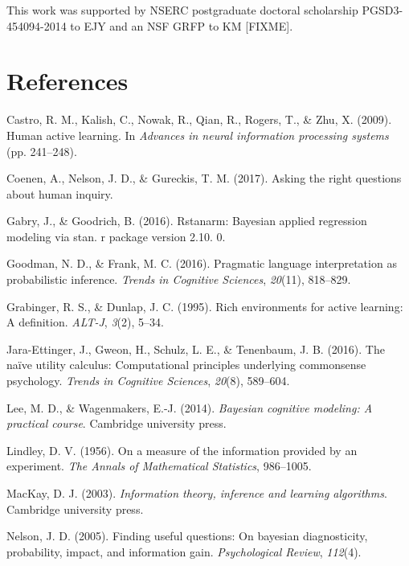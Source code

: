 \documentclass[10pt, letterpaper]{article}
\begin{document}
This work was supported by NSERC postgraduate doctoral scholarship
PGSD3-454094-2014 to EJY and an NSF GRFP to KM {[}FIXME{]}.

\section{References}\label{references}

\setlength{\parindent}{-0.1in} \setlength{\leftskip}{0.125in} \noindent

\hypertarget{refs}{}
\hypertarget{ref-castro2009human}{}
Castro, R. M., Kalish, C., Nowak, R., Qian, R., Rogers, T., \& Zhu, X.
(2009). Human active learning. In \emph{Advances in neural information
processing systems} (pp. 241--248).

\hypertarget{ref-coenen2017}{}
Coenen, A., Nelson, J. D., \& Gureckis, T. M. (2017). Asking the right
questions about human inquiry.

\hypertarget{ref-gabry2016rstanarm}{}
Gabry, J., \& Goodrich, B. (2016). Rstanarm: Bayesian applied regression
modeling via stan. r package version 2.10. 0.

\hypertarget{ref-goodman2016}{}
Goodman, N. D., \& Frank, M. C. (2016). Pragmatic language
interpretation as probabilistic inference. \emph{Trends in Cognitive
Sciences}, \emph{20}(11), 818--829.

\hypertarget{ref-grabinger1995rich}{}
Grabinger, R. S., \& Dunlap, J. C. (1995). Rich environments for active
learning: A definition. \emph{ALT-J}, \emph{3}(2), 5--34.

\hypertarget{ref-jara2016}{}
Jara-Ettinger, J., Gweon, H., Schulz, L. E., \& Tenenbaum, J. B. (2016).
The naïve utility calculus: Computational principles underlying
commonsense psychology. \emph{Trends in Cognitive Sciences},
\emph{20}(8), 589--604.

\hypertarget{ref-lee2014bayesian}{}
Lee, M. D., \& Wagenmakers, E.-J. (2014). \emph{Bayesian cognitive
modeling: A practical course}. Cambridge university press.

\hypertarget{ref-lindley1956}{}
Lindley, D. V. (1956). On a measure of the information provided by an
experiment. \emph{The Annals of Mathematical Statistics}, 986--1005.

\hypertarget{ref-mackay2003}{}
MacKay, D. J. (2003). \emph{Information theory, inference and learning
algorithms}. Cambridge university press.

\hypertarget{ref-nelson2005}{}
Nelson, J. D. (2005). Finding useful questions: On bayesian
diagnosticity, probability, impact, and information gain.
\emph{Psychological Review}, \emph{112}(4).
\end{document}
